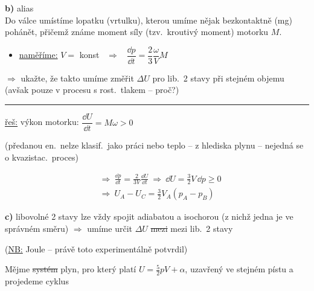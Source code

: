 \textbf{b)} alias  \\
Do válce umístíme lopatku (vrtulku), kterou umíme nějak bezkontaktně (mg) pohánět, přičemž známe moment síly (tzv.\ kroutivý moment) motorku $M$.
\begin{itemize}
  \item \underline{naměříme:} \quad $V = $ konst \ $\Rightarrow$ \ $\dfrac{\dd p}{\dd t} = \dfrac23\dfrac{\omega}{V}M$
\end{itemize}
$\Rightarrow$ ukažte, že takto umíme změřit $\Delta U$ pro lib.\ 2 stavy při stejném objemu \\
\quad (avšak pouze v procesu s rost.\ tlakem -- proč?)

\rule{3cm}{0.4pt}

\underline{řeš:} \quad výkon motorku: \quad $\dfrac{\dd U}{\dd t} = M\omega > 0$

\begin{minipage}{0.06\textwidth}\Huge\pozor{!}\end{minipage}
\begin{minipage}{0.9\textwidth}
(předanou en.\ nelze klasif.\ jako práci nebo teplo -- z hlediska plynu -- nejedná se o kvazistac.\ proces)
\end{minipage}
\begin{align*}
  &\Rightarrow\ \frac{\dd p}{\dd t} = \frac{2}{3V}\frac{\dd U}{\dd t} \ \Rightarrow\ \dd U = \frac32 V\,\dd p \geq 0 \\
  &\Rightarrow\ U_A - U_C = \frac32 V_A(p_A - p_B)
\end{align*}

\textbf{c)} libovolné 2 stavy lze vždy spojit adiabatou a isochorou (z nichž jedna je ve správném směru) $\Rightarrow$ umíme určit $\Delta U$ \sout{mezi} mezi lib.\ 2 stavy

\begin{minipage}[t]{0.3\textwidth}\small
{}
\end{minipage}
\begin{minipage}[t]{0.65\textwidth}
(\underline{NB:} Joule -- právě toto experimentálně potvrdil)
\end{minipage}

\begin{priklad}[Př.\ 2]
Mějme \sout{systém} plyn, pro který platí $U = \frac52 pV + \alpha$, uzavřený ve stejném pístu a projedeme cyklus
\end{priklad}

